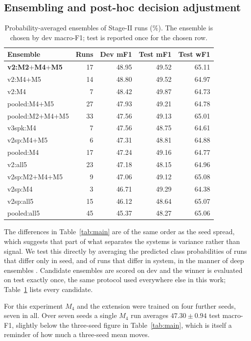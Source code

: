 \documentclass[sigconf,nonacm]{acmart}
\begin{document}
\subsection{Ensembling and post-hoc decision adjustment}
\begin{table}[t]
\centering
\caption{Probability-averaged ensembles of Stage-II runs (\%). The ensemble is chosen by dev macro-F1; test is reported once for the chosen row.}
\label{tab:ensemble}
\begin{tabular}{lrrrr}
\toprule
Ensemble & Runs & Dev mF1 & Test mF1 & Test wF1 \\
\midrule
\textbf{v2:M2$+$M4$+$M5} & 17 & 48.95 & 49.52 & 65.11 \\
v2:M4$+$M5 & 14 & 48.80 & 49.52 & 64.97 \\
v2:M4 & 7 & 48.42 & 49.87 & 64.73 \\
pooled:M4$+$M5 & 27 & 47.93 & 49.21 & 64.78 \\
pooled:M2$+$M4$+$M5 & 33 & 47.56 & 49.13 & 65.01 \\
v3spk:M4 & 7 & 47.56 & 48.75 & 64.61 \\
v2sp:M4$+$M5 & 6 & 47.31 & 48.81 & 64.88 \\
pooled:M4 & 17 & 47.24 & 49.16 & 64.77 \\
v2:all5 & 23 & 47.18 & 48.15 & 64.96 \\
v2sp:M2$+$M4$+$M5 & 9 & 47.06 & 49.12 & 65.08 \\
v2sp:M4 & 3 & 46.71 & 49.29 & 64.38 \\
v2sp:all5 & 15 & 46.12 & 48.64 & 65.07 \\
pooled:all5 & 45 & 45.37 & 48.27 & 65.06 \\
\bottomrule
\end{tabular}
\end{table}

The differences in Table~\ref{tab:main} are of the same order as the seed spread, which
suggests that part of what separates the systems is variance rather than signal. We test
this directly by averaging the predicted class probabilities of runs that differ only in
seed, and of runs that differ in system, in the manner of deep ensembles
\citep{lakshminarayanan2016ensembles}. Candidate ensembles are scored on dev and the
winner is evaluated on test exactly once, the same protocol used everywhere else in this
work; Table~\ref{tab:ensemble} lists every candidate.

For this experiment $M_4$ and the extension were trained on four further seeds, seven in
all. Over seven seeds a single $M_4$ run averages $47.30 \pm 0.94$ test macro-F1, slightly
below the three-seed figure in Table~\ref{tab:main}, which is itself a reminder of how much
a three-seed mean moves.
\end{document}
